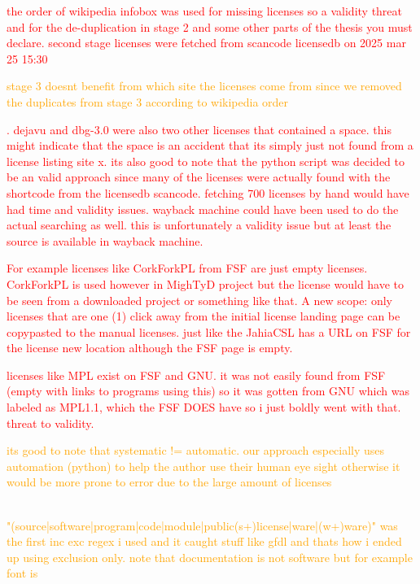 \textcolor{red}{the order of wikipedia infobox was used for missing licenses so a validity threat and for the de-duplication in stage 2 and some other parts of the thesis you must declare. second stage licenses were fetched from scancode licensedb on 2025 mar 25 15:30}

\textcolor{orange}{stage 3 doesnt benefit from which site the licenses come from since we removed the duplicates from stage 3 according to wikipedia order}

\textcolor{red}{. dejavu and dbg-3.0 were also two other licenses that contained a space. this might indicate that the space is an accident that its simply just not found from a license listing site x. its also good to note that the python script was decided to be an valid approach since many of the licenses were actually found with the shortcode from the licensedb scancode. fetching 700 licenses by hand would have had time and validity issues. wayback machine could have been used to do the actual searching as well. this is unfortunately a validity issue but at least the source is available in wayback machine.}

\textcolor{red}{For example licenses like CorkForkPL from FSF are just empty licenses. CorkForkPL is used however in MighTyD project but the license would have to be seen from a downloaded project or something like that. A new scope: only licenses that are one (1) click away from the initial license landing page can be copypasted to the manual licenses. just like the JahiaCSL has a URL on FSF for the license new location although the FSF page is empty.}

\textcolor{red}{licenses like MPL exist on FSF and GNU. it was not easily found from FSF (empty with links to programs using this) so it was gotten from GNU which was labeled as MPL1.1, which the FSF DOES have so i just boldly went with that. threat to validity.}

\textcolor{orange}{its good to note that systematic != automatic. our approach especially uses automation (python) to help the author use their human eye sight otherwise it would be more prone to error due to the large amount of licenses}

\textcolor{orange}{\\"(source|software|program|code|module|public(s+)license|ware|(w+)ware)" was the first inc exc regex i used and it caught stuff like gfdl and thats how i ended up using exclusion only. note that documentation is not software but for example font is}

